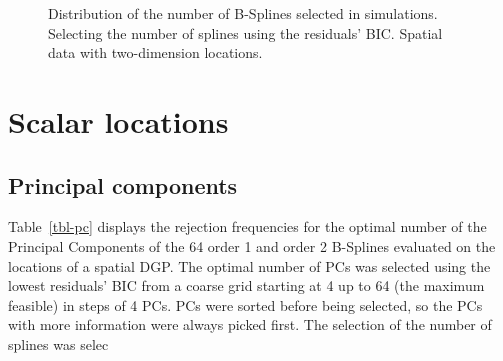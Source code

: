 \documentclass[
]{article}
\begin{document}
\begin{figure}

\begin{minipage}[t]{0.50\linewidth}

{\centering 


}

\end{minipage}%
%
\begin{minipage}[t]{0.50\linewidth}

{\centering 


}

\end{minipage}%

\caption{\label{fig-splines-bic-vd-spa}Distribution of the number of
B-Splines selected in simulations. Selecting the number of splines using
the residuals' BIC. Spatial data with two-dimension locations.}

\end{figure}

\hypertarget{scalar-locations}{%
\section{Scalar locations}\label{scalar-locations}}

\hypertarget{principal-components}{%
\subsection{Principal components}\label{principal-components}}

Table~\ref{tbl-pc} displays the rejection frequencies for the optimal
number of the Principal Components of the 64 order 1 and order 2
B-Splines evaluated on the locations of a spatial DGP. The optimal
number of PCs was selected using the lowest residuals' BIC from a coarse
grid starting at 4 up to 64 (the maximum feasible) in steps of 4 PCs.
PCs were sorted before being selected, so the PCs with more information
were always picked first. The selection of the number of splines was
selec
\end{document}
